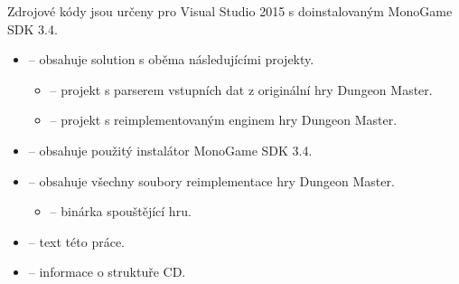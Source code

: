 \endgroup

Zdrojové kódy jsou určeny pro Visual Studio 2015 s doinstalovaným MonoGame SDK 3.4.
\begin{itemize}
\item {} -- obsahuje solution s oběma následujícími projekty.
	\begin{itemize}
	\item {} -- projekt s parserem vstupních dat z originální hry Dungeon Master.
	\item {} -- projekt s reimplementovaným enginem hry Dungeon Master.
	\end{itemize}
\item {} -- obsahuje použitý instalátor MonoGame SDK 3.4.
\item {} -- obsahuje všechny soubory reimplementace hry Dungeon Master.
	\begin{itemize}
	\item {}  -- binárka spouštějící hru.
	\end{itemize}
\item {} -- text této práce.
\item {} -- informace o struktuře CD.
\end{itemize}